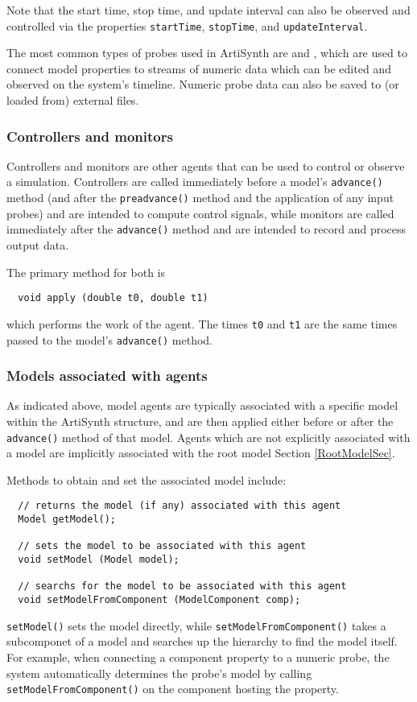 \documentclass{article}
\begin{document}
Note that the start time, stop time, and update interval can also be
observed and controlled via the properties {\tt startTime}, {\tt stopTime},
and {\tt updateInterval}.

The most common types of probes used in ArtiSynth are
 and , which are
used to connect model properties to streams of numeric data which can
be edited and observed on the system's timeline. Numeric probe data
can also be saved to (or loaded from) external files.

\subsubsection{Controllers and monitors}

Controllers and monitors are other agents that can be used to control
or observe a simulation. Controllers are called immediately before a
model's {\tt advance()} method (and after the {\tt preadvance()}
method and the application of any input probes) and are intended to
compute control signals, while monitors are called immediately after
the {\tt advance()} method and are intended to record and process
output data.

The primary method for both is

\begin{lstlisting}
  void apply (double t0, double t1)
\end{lstlisting}

which performs the work of the agent. The times {\tt t0} and {\tt t1}
are the same times passed to the model's {\tt advance()} method.

\subsubsection{Models associated with agents}
\label{AssociatedModelsSec}

As indicated above, model agents are typically associated with a
specific model within the ArtiSynth structure, and are then applied
either before or after the {\tt advance()} method of that model.  Agents
which are not explicitly associated with a model are implicitly
associated with the root model Section \ref{RootModelSec}.

Methods to obtain and set the associated model include:
\begin{lstlisting}
  // returns the model (if any) associated with this agent
  Model getModel();

  // sets the model to be associated with this agent
  void setModel (Model model);

  // searchs for the model to be associated with this agent
  void setModelFromComponent (ModelComponent comp);
\end{lstlisting}
{\tt setModel()} sets the model directly, while {\tt setModelFromComponent()}
takes a subcomponet of a model and searches up the hierarchy to find
the model itself. For example, when connecting a component property to
a numeric probe, the system automatically determines the probe's model
by calling {\tt setModelFromComponent()} on the component hosting the
property.
\end{document}
